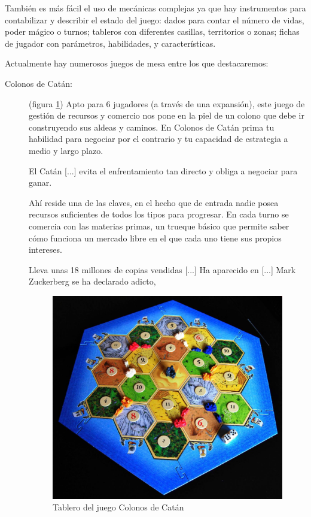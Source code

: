 También es más fácil el uso de mecánicas complejas ya que hay instrumentos para contabilizar y describir el estado del juego: dados para contar el número de vidas, poder mágico o turnos; tableros con diferentes casillas, territorios o zonas; fichas de jugador con parámetros, habilidades, y características.

Actualmente hay numerosos juegos de mesa entre los que destacaremos:
\begin{description}
\item[Colonos de Catán: ] (figura \ref{catan})  Apto para 6 jugadores (a través de una expansión), este juego de gestión de recursos y comercio nos pone en la piel de un colono que debe ir construyendo sus aldeas y caminos. En Colonos de Catán prima tu habilidad para negociar por el contrario y tu capacidad de estrategia a medio y largo plazo. \cite{faceentrepreneurship2016}

El Catán [...] evita el enfrentamiento tan directo y obliga a negociar para ganar.

Ahí reside una de las claves, en el hecho que de entrada nadie posea recursos suficientes de todos los tipos para progresar. En cada turno se comercia con las materias primas, un trueque básico que permite saber cómo funciona un mercado libre en el que cada uno tiene sus propios intereses. \cite{albertini2015}

Lleva unas 18 millones de copias vendidas [...] Ha aparecido en  [...] Mark Zuckerberg se ha declarado adicto,  \cite{albertini2015}

\begin{figure}
\begin{center}
\includegraphics[scale=0.3]{imagenes/catan.jpg}
\caption{Tablero del juego Colonos de Catán}
\label{catan}
\end{center}
\end{figure}



\end{description}
